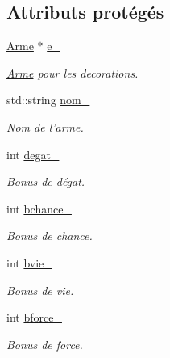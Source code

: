\subsection*{Attributs protégés}
\begin{DoxyCompactItemize}
\item 
\hypertarget{class_d_arme_a03856c36a22fe5bb49f6479d0b864df2}{\hyperlink{class_arme}{Arme} $\ast$ \hyperlink{class_d_arme_a03856c36a22fe5bb49f6479d0b864df2}{e\-\_\-}}\label{class_d_arme_a03856c36a22fe5bb49f6479d0b864df2}

\begin{DoxyCompactList}\small\item\em \hyperlink{class_arme}{Arme} pour les decorations. \end{DoxyCompactList}\item 
\hypertarget{class_arme_a347394a5ab5c3230259c1b7117f3e8d6}{std\-::string \hyperlink{class_arme_a347394a5ab5c3230259c1b7117f3e8d6}{nom\-\_\-}}\label{class_arme_a347394a5ab5c3230259c1b7117f3e8d6}

\begin{DoxyCompactList}\small\item\em Nom de l'arme. \end{DoxyCompactList}\item 
\hypertarget{class_arme_a15f99a8b95c2d6f5beb9f473df79e399}{int \hyperlink{class_arme_a15f99a8b95c2d6f5beb9f473df79e399}{degat\-\_\-}}\label{class_arme_a15f99a8b95c2d6f5beb9f473df79e399}

\begin{DoxyCompactList}\small\item\em Bonus de dégat. \end{DoxyCompactList}\item 
\hypertarget{class_arme_a688792d4393f9e690aa103a8e68c541c}{int \hyperlink{class_arme_a688792d4393f9e690aa103a8e68c541c}{bchance\-\_\-}}\label{class_arme_a688792d4393f9e690aa103a8e68c541c}

\begin{DoxyCompactList}\small\item\em Bonus de chance. \end{DoxyCompactList}\item 
\hypertarget{class_arme_a4606c075b38ef49f6ed2ed06d6185173}{int \hyperlink{class_arme_a4606c075b38ef49f6ed2ed06d6185173}{bvie\-\_\-}}\label{class_arme_a4606c075b38ef49f6ed2ed06d6185173}

\begin{DoxyCompactList}\small\item\em Bonus de vie. \end{DoxyCompactList}\item 
\hypertarget{class_arme_a779e9838aa9c50d948f58b593fc5954b}{int \hyperlink{class_arme_a779e9838aa9c50d948f58b593fc5954b}{bforce\-\_\-}}\label{class_arme_a779e9838aa9c50d948f58b593fc5954b}

\begin{DoxyCompactList}\small\item\em Bonus de force. \end{DoxyCompactList}\end{DoxyCompactItemize}


